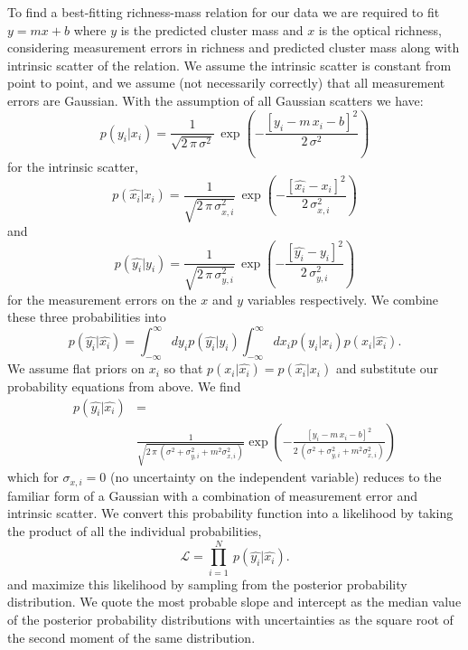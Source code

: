 To find a best-fitting richness-mass relation for our data we are required to fit $y=mx+b$ where $y$ is the predicted cluster mass and $x$ is the optical richness, considering measurement errors in richness and predicted cluster mass along with intrinsic scatter of the relation. We assume the intrinsic scatter is constant from point to point, and we assume (not necessarily correctly) that all measurement errors are Gaussian. With the assumption of all Gaussian scatters we have:
\begin{equation}\label{2eqn:intrinsic scatter}
	p(y_i|x_i) = \frac{1}{\sqrt{2\,\pi\,\sigma^2}}
	 \,\exp\left(-\frac{[y_i - m\,x_i - b]^2}{2\,\sigma^2}\right)
\end{equation}
for the intrinsic scatter,
\begin{equation}\label{2eqn:xerr}
	p(\hat{x_i}|x_i) = \frac{1}{\sqrt{2\,\pi\,\sigma_{x,i}^2}}
	 \,\exp\left(-\frac{[\hat{x_i} - x_i]^2}{2\,\sigma_{x,i}^2}\right)
\end{equation}
and
\begin{equation}\label{2eqn:yerr}
	p(\hat{y_i}|y_i) = \frac{1}{\sqrt{2\,\pi\,\sigma_{y,i}^2}}
	 \,\exp\left(-\frac{[\hat{y_i} -y_i]^2}{2\,\sigma_{y,i}^2}\right)
\end{equation}
for the measurement errors on the $x$ and $y$ variables respectively. We combine these three probabilities into
\begin{equation}
	p(\hat{y_i}|\hat{x_i}) = \int_{-\infty}^\infty dy_ip(\hat{y_i}|y_i) \int_{-\infty}^\infty dx_ip(y_i|x_i)p(x_i|\hat{x_i}).
\end{equation}
We assume flat priors on $x_i$ so that $p(x_i|\hat{x_i}) = p(\hat{x_i}|x_i)$ and substitute our probability equations from above. We find
\begin{equation}
	\begin{split}
	p(\hat{y_i}|\hat{x_i}) & = \\ 
	&\frac{1}{\sqrt{2\,\pi\,(\sigma^2 + \sigma_{y,i}^2 + m^2\sigma_{x,i}^2)}}\exp\left(-\frac{[y_i - m\,x_i - b]^2}{2\,(\sigma^2 + \sigma_{y,i}^2 + m^2\sigma_{x,i}^2)}\right)
	\end{split}
\end{equation}
which for $\sigma_{x,i}=0$ (no uncertainty on the independent variable) reduces to the familiar form of a Gaussian with a combination of measurement error and intrinsic scatter. We convert this probability function into a likelihood by taking the product of all the individual probabilities,  
\begin{equation}\label{2eq:like}
\mathscr{L} = \prod_{i=1}^N \ p(\hat{y_i}|\hat{x_i}).
\end{equation}
and maximize this likelihood by sampling from the posterior probability distribution. We quote the most probable slope and intercept as the median value of the posterior probability distributions with uncertainties as the square root of the second moment of the same distribution.

